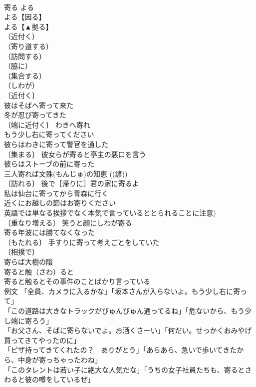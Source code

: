 \documentclass[8pt]{extreport}
\begin{document}
\begin{CJK}{UTF8}{min}
\\	寄る	よる	
\\	よる【因る】 
\\	よる【▲拠る】 
\\	（近付く）
\\	（寄り道する）
\\	（訪問する）
\\	（脇に）
\\	（集合する）
\\	（しわが）
\\	〔近付く〕
\\	彼はそばへ寄って来た 
\\	冬が忍び寄ってきた 
\\	〔端に近付く〕 わきへ寄れ 
\\	もう少し右に寄ってください 
\\	彼らはわきに寄って警官を通した 
\\	〔集まる〕 彼女らが寄ると亭主の悪口を言う 
\\	彼らはストーブの前に寄った 
\\	三人寄れば文殊(もんじゅ)の知恵 ((諺)) 
\\	〔訪れる〕 後で［帰りに］君の家に寄るよ 
\\	私は仙台に寄ってから青森に行く 
\\	近くにお越しの節はお寄りください 
\\	英語では単なる挨拶でなく本気で言っているととられることに注意) 
\\	〔重なり増える〕 笑うと顔にしわが寄る 
\\	寄る年波には勝てなくなった 
\\	〔もたれる〕 手すりに寄って考えごとをしていた 
\\	〔相撲で〕
\\	寄らば大樹の陰 
\\	寄ると触（さわ）ると　
\\	寄ると触るとその事件のことばかり言っている 
\\	例文 「全員、カメラに入るかな」「坂本さんが入らないよ。もう少し右に寄って」 
\\	「この道路は大きなトラックがびゅんびゅん通ってるね」「危ないから、もう少し端に寄ろう」 
\\	「お父さん、そばに寄らないでよ。お酒くさーい」「何だい。せっかくおみやげ買ってきてやったのに」 
\\	「ピザ持ってきてくれたの？　ありがとう」「あらあら、急いで歩いてきたから、中身が寄っちゃったわね」 
\\	「このタレントは若い子に絶大な人気だな」「うちの女子社員たちも、寄るとさわると彼の噂をしているぜ」 

\end{CJK}
\end{document}
